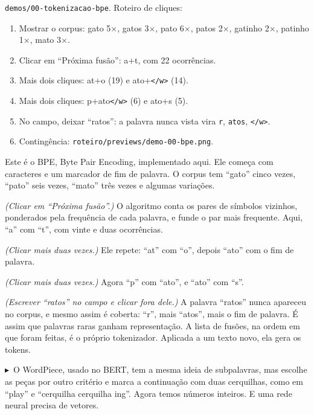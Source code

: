 \documentclass[11pt,a4paper]{article}
\newenvironment{barralateral}[2]{%
  \def\FrameCommand{{\color{#1}\vrule width 2pt}\hspace{7pt}}%
  \MakeFramed{\advance\hsize-\width\FrameRestore}%
  \noindent{\small\bfseries\color{#1}\MakeUppercase{#2}}\par\nopagebreak
}{\endMakeFramed}
\newcommand{\clique}{\colorbox{azul}{\color{white}\scriptsize$\blacktriangleright$}\,}
\begin{document}
\begin{barralateral}{verde}{Demonstração}
\texttt{demos/\allowbreak{}00-tokenizacao-bpe}. Roteiro de cliques:

\begin{enumerate}
\item Mostrar o corpus: gato 5$\times$, gatos 3$\times$, pato 6$\times$, patos 2$\times$, gatinho 2$\times$, patinho 1$\times$, mato 3$\times$.
\item Clicar em “Próxima fusão”: a+t, com 22 ocorrências.
\item Mais dois cliques: at+o (19) e ato+\texttt{\textless{}/\allowbreak{}w\textgreater{}} (14).
\item Mais dois cliques: p+ato\texttt{\textless{}/\allowbreak{}w\textgreater{}} (6) e ato+s (5).
\item No campo, deixar “ratos”: a palavra nunca vista vira \texttt{r}, \texttt{atos}, \texttt{\textless{}/\allowbreak{}w\textgreater{}}.
\item Contingência: \texttt{roteiro/\allowbreak{}previews/\allowbreak{}demo-00-bpe.png}.
\end{enumerate}
\end{barralateral}
\begin{barralateral}{azul}{Texto falado}
Este é o BPE, Byte Pair Encoding, implementado aqui. Ele começa com caracteres e um marcador de fim de palavra. O corpus tem “gato” cinco vezes, “pato” seis vezes, “mato” três vezes e algumas variações.

\emph{(Clicar em “Próxima fusão”.)} O algoritmo conta os pares de símbolos vizinhos, ponderados pela frequência de cada palavra, e funde o par mais frequente. Aqui, “a” com “t”, com vinte e duas ocorrências.

\emph{(Clicar mais duas vezes.)} Ele repete: “at” com “o”, depois “ato” com o fim de palavra.

\emph{(Clicar mais duas vezes.)} Agora “p” com “ato”, e “ato” com “s”.

\emph{(Escrever “ratos” no campo e clicar fora dele.)} A palavra “ratos” nunca apareceu no corpus, e mesmo assim é coberta: “r”, mais “atos”, mais o fim de palavra. É assim que palavras raras ganham representação. A lista de fusões, na ordem em que foram feitas, é o próprio tokenizador. Aplicada a um texto novo, ela gera os tokens.

\clique{} O WordPiece, usado no BERT, tem a mesma ideia de subpalavras, mas escolhe as peças por outro critério e marca a continuação com duas cerquilhas, como em “play” e “cerquilha cerquilha ing”. Agora temos números inteiros. E uma rede neural precisa de vetores.

\end{barralateral}
\end{document}
